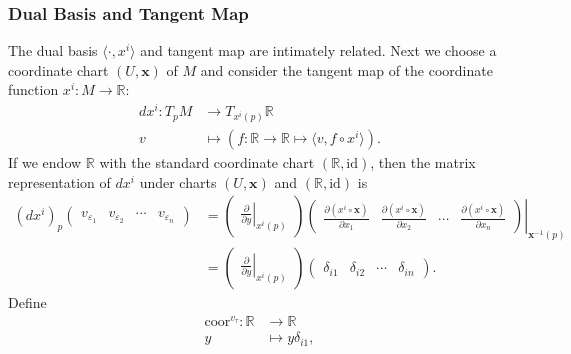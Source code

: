 \documentclass{report}
\begin{document}
\subsubsection{Dual Basis and Tangent Map}
The dual basis $\langle\cdot,{x}^i\rangle$ and tangent map are intimately related. 
Next we choose a coordinate chart $(U,\mathbf{x})$ of $M$ and consider the tangent map of the coordinate function ${x}^i: M\to \mathbb{R}$:
\[
    \begin{aligned}
        d{x}^i:T_pM&\longrightarrow T_{{x}^i(p)}\mathbb{R}\\
        v&\longmapsto \left(f:\mathbb{R}\to \mathbb{R} \longmapsto\langle v,f\circ {x}^i\rangle\right).
    \end{aligned}
\]
If we endow $\mathbb{R}$ with the standard coordinate chart $(\mathbb{R},\mathrm{id})$, then the matrix representation of $d{x}^i$ under charts $(U,\mathbf{x})$ and $(\mathbb{R},\mathrm{id})$ is
\[
    \begin{aligned}
    (d{x}^i)_p
    \begin{pmatrix}
    v_{\varepsilon_1}&v_{\varepsilon_2}&\cdots&v_{\varepsilon_n}
    \end{pmatrix}
    &=
    \begin{pmatrix}
        \left.\frac{\partial}{\partial y}\right|_{{x}^i(p)}
    \end{pmatrix}
    \left.\begin{pmatrix}
        \frac{\partial({x}^i\circ\mathbf{x})}{\partial
x_1}&\frac{\partial({x}^i\circ\mathbf{x})}{\partial
x_2}&\cdots&\frac{\partial({x}^i\circ\mathbf{x})}{\partial x_n}
    \end{pmatrix}\right|_{\mathbf{x}^{-1}(p)}\\
    &=\begin{pmatrix}
        \left.\frac{\partial}{\partial y}\right|_{{x}^i(p)}
    \end{pmatrix}
    \begin{pmatrix}
        \delta_{i1} &\delta_{i2}&\cdots&\delta_{in}
    \end{pmatrix}.
    \end{aligned}
    \]
Define
\[
    \begin{aligned}
        \mathrm{coor}^{v_{\tau}}:\mathbb{R}&\longrightarrow\mathbb{R}\\
        y&\longmapsto y\delta_{i1},
    \end{aligned}
\]

\end{document}
